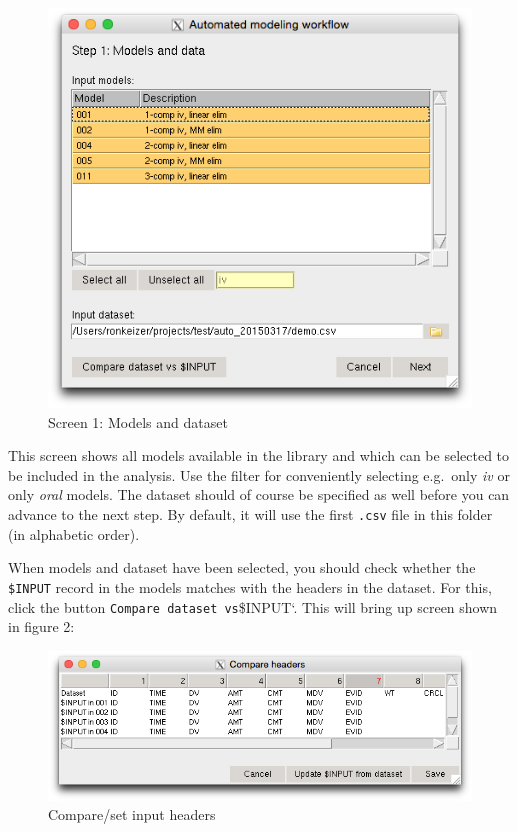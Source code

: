 \begin{figure}[htbp]
\centering
\includegraphics[scale=0.5]{images/screen1.png}
\caption{Screen 1: Models and dataset}
\end{figure}

This screen shows all models available in the library and which can be
selected to be included in the analysis. Use the filter for conveniently
selecting e.g.~only \emph{iv} or only \emph{oral} models. The dataset
should of course be specified as well before you can advance to the next
step. By default, it will use the first \texttt{.csv} file in this
folder (in alphabetic order).

When models and dataset have been selected, you should check whether the
\texttt{\$INPUT} record in the models matches with the headers in the
dataset. For this, click the button \texttt{Compare dataset vs}\$INPUT`.
This will bring up screen shown in figure 2:

\begin{figure}[htbp]
\centering
\includegraphics[scale=0.5]{images/compare.png}
\caption{Compare/set input headers}
\end{figure}

